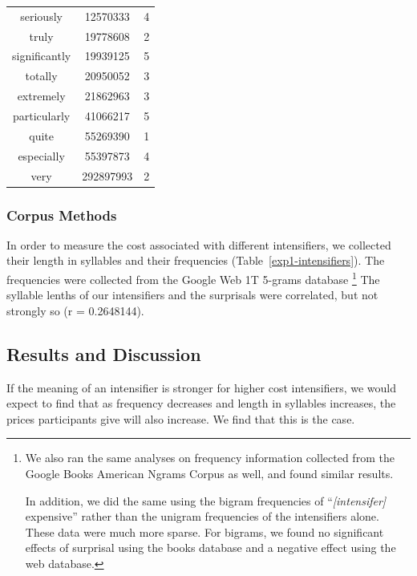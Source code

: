 \documentclass[10pt,letterpaper]{article}
\begin{document}
\begin{table}[ht]
\begin{center}
\begin{tabular}{ccc}
    seriously & 12570333 & 4 \\
    truly & 19778608 & 2 \\
    significantly & 19939125 & 5 \\
    totally & 20950052 & 3 \\
    extremely & 21862963 & 3 \\
    particularly & 41066217 & 5 \\
    quite & 55269390 & 1 \\
    especially & 55397873 & 4 \\
    very & 292897993 & 2
  \end{tabular}
 \end{center}
\end{table}

\subsubsection{Corpus Methods}

In order to measure the cost associated with different intensifiers, we collected their length in syllables and their frequencies (Table~\ref{exp1-intensifiers}).
The frequencies were collected from the Google Web 1T 5-grams database \cite{web1t5gram}\footnote{
We also ran the same analyses on frequency information collected from the Google Books American Ngrams Corpus \cite{books2011} as well, and found similar results.

In addition, we did the same using the bigram frequencies of ``\emph{[intensifer]} expensive'' rather than the unigram frequencies of the intensifiers alone. These data were much more sparse. For bigrams, we found no significant effects of surprisal using the books database and a negative effect using the web database.
}
The syllable lenths of our intensifiers and the surprisals  were correlated, but not strongly so (r = 0.2648144).

\subsection{Results and Discussion}

If the meaning of an intensifier is stronger for higher cost intensifiers, we would expect to find that as frequency decreases and length in syllables increases, the prices participants give will also increase. We find that this is the case.
\end{document}

